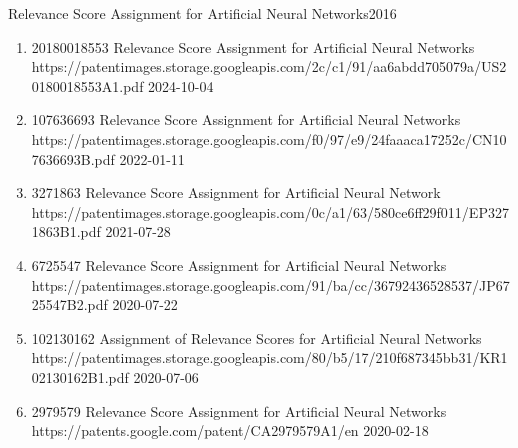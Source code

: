 \headedsubsection %
{Relevance Score Assignment for Artificial Neural Networks}{2016}
{
    \ifdefined\shortcv
        {}
    \else
        {
            \begin{enumerate}
                \item [] 
                                {20180018553}
                                {Relevance Score Assignment for Artificial Neural Networks }
                                {https://patentimages.storage.googleapis.com/2c/c1/91/aa6abdd705079a/US20180018553A1.pdf}
                                {2024-10-04}  

                \item[] 
                                {107636693}
                                {Relevance Score Assignment for Artificial Neural Networks}
                                {https://patentimages.storage.googleapis.com/f0/97/e9/24faaaca17252c/CN107636693B.pdf}
                                {2022-01-11}

                \item [] 
                                {3271863}
                                {Relevance Score Assignment for Artificial Neural Network}
                                {https://patentimages.storage.googleapis.com/0c/a1/63/580ce6ff29f011/EP3271863B1.pdf}
                                {2021-07-28}

                \item [] 
                                {6725547}
                                {Relevance Score Assignment for Artificial Neural Networks}
                                {https://patentimages.storage.googleapis.com/91/ba/cc/36792436528537/JP6725547B2.pdf}
                                {2020-07-22}

                \item [] 
                                {102130162}
                                {Assignment of Relevance Scores for Artificial Neural Networks}
                                {https://patentimages.storage.googleapis.com/80/b5/17/210f687345bb31/KR102130162B1.pdf}
                                {2020-07-06}

                \item [] 
                                {2979579}
                                {Relevance Score Assignment for Artificial Neural Networks}
                                {https://patents.google.com/patent/CA2979579A1/en}
                                {2020-02-18}


\end{enumerate}}}
